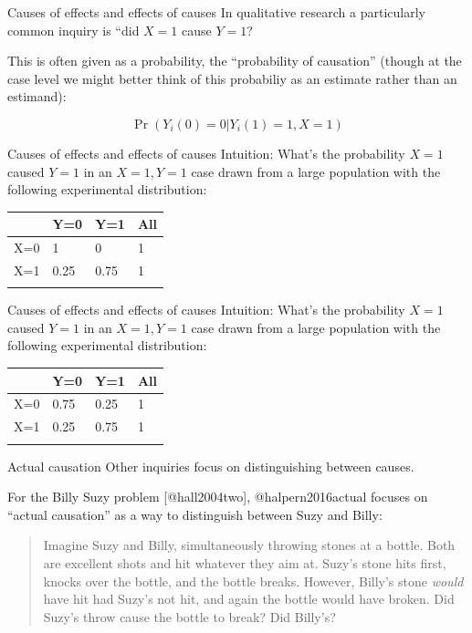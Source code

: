 \documentclass[
  11pt,
  ignorenonframetext,
]{beamer}
\begin{document}
\begin{frame}{Causes of effects and effects of causes}
\protect\hypertarget{causes-of-effects-and-effects-of-causes}{}
In qualitative research a particularly common inquiry is ``did \(X=1\)
cause \(Y=1\)?

This is often given as a probability, the ``probability of causation''
(though at the case level we might better think of this probabiliy as an
estimate rather than an estimand):

\[\Pr(Y_i(0) = 0 | Y_i(1) = 1, X = 1)\]
\end{frame}

\begin{frame}{Causes of effects and effects of causes}
\protect\hypertarget{causes-of-effects-and-effects-of-causes-1}{}
Intuition: What's the probability \(X=1\) caused \(Y=1\) in an
\(X=1, Y=1\) case drawn from a large population with the following
experimental distribution:

\begin{longtable}[]{@{}llll@{}}
\toprule\noalign{}
& Y=0 & Y=1 & All \\
\midrule\noalign{}
\endhead
X=0 & 1 & 0 & 1 \\
X=1 & 0.25 & 0.75 & 1 \\
\bottomrule\noalign{}
\end{longtable}
\end{frame}

\begin{frame}{Causes of effects and effects of causes}
\protect\hypertarget{causes-of-effects-and-effects-of-causes-2}{}
Intuition: What's the probability \(X=1\) caused \(Y=1\) in an
\(X=1, Y=1\) case drawn from a large population with the following
experimental distribution:

\begin{longtable}[]{@{}llll@{}}
\toprule\noalign{}
& Y=0 & Y=1 & All \\
\midrule\noalign{}
\endhead
X=0 & 0.75 & 0.25 & 1 \\
X=1 & 0.25 & 0.75 & 1 \\
\bottomrule\noalign{}
\end{longtable}
\end{frame}

\begin{frame}{Actual causation}
\protect\hypertarget{actual-causation}{}
Other inquiries focus on distinguishing between causes.

For the Billy Suzy problem {[}@hall2004two{]}, @halpern2016actual
focuses on ``actual causation'' as a way to distinguish between Suzy and
Billy:

\begin{quote}
Imagine Suzy and Billy, simultaneously throwing stones at a bottle. Both
are excellent shots and hit whatever they aim at. Suzy's stone hits
first, knocks over the bottle, and the bottle breaks. However, Billy's
stone \emph{would} have hit had Suzy's not hit, and again the bottle
would have broken. Did Suzy's throw cause the bottle to break? Did
Billy's?
\end{quote}
\end{frame}
\end{document}
